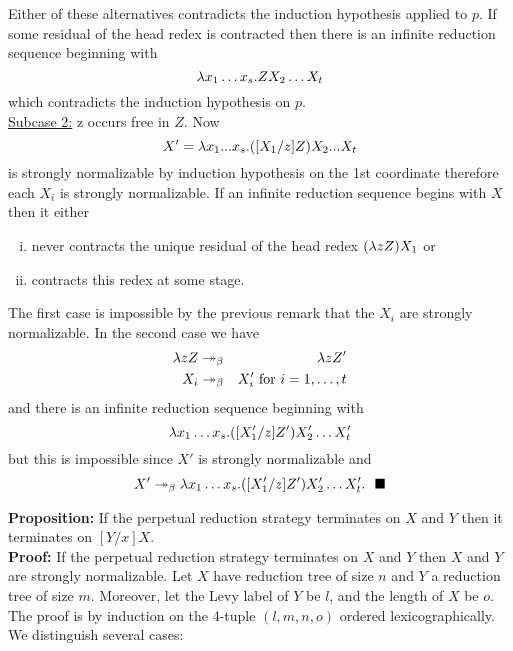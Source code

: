 Either of these alternatives contradicts the induction hypothesis applied to $p$. If some residual of the head redex is contracted then there is an infinite reduction sequence beginning with
\begin{equation*}
  \lambda x_{1} \ldots x_{s}. Z X_{2} \ldots X_{t}
\end{equation*}
which contradicts the induction hypothesis on $p$.\\

\uline{Subcase 2:} z occurs free in $Z$. Now
\begin{equation*}
  X' = \lambda x_{1} ... x_{s}. ([X_{1}/z]Z)X_{2} ... X_{t}
\end{equation*}
is strongly normalizable by induction hypothesis on the 1st coordinate therefore each $X_{i}$ is strongly normalizable. If an infinite reduction sequence begins with $X$ then it either
\begin{enumerate}[(i)]
\item never contracts the unique residual of the head redex $(\lambda zZ)X_{1}$ or
\item contracts this redex at some stage.
\end{enumerate}

The first case is impossible by the previous remark that the $X_{i}$ are strongly normalizable. In the second case we have
\begin{eqnarray*}
  \lambda zZ &\twoheadrightarrow_\beta& \lambda zZ'\\
  X_{i} &\twoheadrightarrow_\beta&  X_{i}'\hbox{ for $i=1,\ldots,t$}
\end{eqnarray*}
and there is an infinite reduction sequence beginning with
\begin{equation*}
  \lambda x_{1} \ldots x_{s}. ([X_{1}'/z]Z')X_{2}' \ldots X_{t}'
\end{equation*}
but this is impossible since $X'$ is strongly normalizable and
\begin{equation*}
  X' \twoheadrightarrow_\beta \lambda x_{1} \ldots x_{s}. ([X_{1}'/z]Z')X_{2}' \ldots X_{t}'.\ \ \blacksquare
\end{equation*}

\vspace{.5in}

\textbf{Proposition:} If the perpetual reduction strategy terminates on $X$ and $Y$ then it terminates on $[Y/x]X$.\\

\textbf{Proof:} If the perpetual reduction strategy terminates on $X$ and $Y$ then $X$ and $Y$ are strongly normalizable. Let $X$ have reduction tree of size $n$ and $Y$ a reduction tree of size $m$. Moreover, let the Levy label of $Y$ be $l$, and the length of $X$ be $o$. The proof is by induction on the 4-tuple $(l,m,n,o)$ ordered lexicographically. We distinguish several cases:\\

